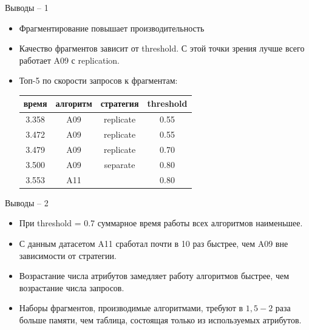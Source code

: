 \documentclass[10pt, dvipsnames]{beamer}
\begin{document}
\begin{frame}{Выводы -- 1}
	\begin{itemize}
	\item Фрагментирование повышает производительность
	\item Качество фрагментов зависит от threshold. С этой точки зрения лучше всего работает A09 с replication.
	\item Топ-5 по скорости запросов к фрагментам:\\[0.1cm]
		\begin{tabular}{ | c | c | c | c |}
				\hline
				время & алгоритм & стратегия & threshold \\ \hline
				3.358 & A09      & replicate & 0.55      \\ \hline
				3.472 & A09      & replicate & 0.55      \\ \hline
				3.479 & A09      & replicate & 0.70      \\ \hline
				3.500 & A09      & separate  & 0.80      \\ \hline
				3.553 & A11      &           & 0.80      \\ 
				\hline
		\end{tabular}
	\end{itemize}
\end{frame}

\begin{frame}{Выводы -- 2}
	\begin{itemize}
\item При threshold = 0.7 суммарное время работы всех алгоритмов наименьшее.

\item С данным датасетом A11 сработал почти в 10 раз быстрее, чем A09 вне зависимости от стратегии.

\item Возрастание числа атрибутов замедляет работу алгоритмов быстрее, чем возрастание числа запросов.

\item Наборы фрагментов, производимые алгоритмами, требуют в $1,5-2$ раза больше памяти, чем таблица, состоящая только из используемых атрибутов.

	\end{itemize}
\end{frame}
\end{document}
